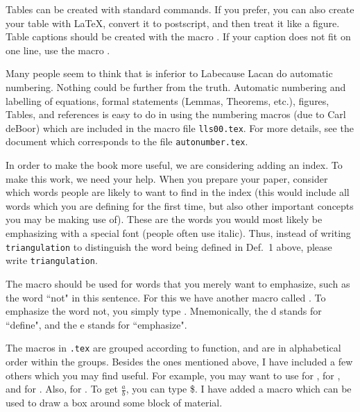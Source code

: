 Tables can be created with standard \Tex commands.  If you prefer,
you can also create your table with La\TeX, convert it to
postscript, and then treat it like a figure.
Table captions should be created with the macro  .
If your caption does not fit on one line, use
the macro .

Many people seem to think that \Tex is inferior to La\Tex because
La\Tex can do automatic numbering.  Nothing could be further
from the truth.  Automatic numbering and labelling of
equations, formal statements (Lemmas, Theorems, etc.), figures,
Tables, and references is easy to do in \Tex using
the numbering macros (due to Carl de\thinspace{}Boor) which
are included in the macro file {\tt lls00.tex}.
For more details, see the document  which corresponds to the \Tex file
{\tt autonumber.tex}.

In order to make the book more useful, we are considering adding an
index.  To make this work, we need your help.  When you prepare your
paper, consider which words people are likely to want to find in the
index (this would include all words which you are defining for the
first time, but also other important concepts you may be making use of).
These are the words you would most likely be emphasizing with a special
font (people often use italic).  Thus, instead of writing
{\tt \lb{} triangulation\rb}
to distinguish the word being defined in Def.~1 above, please write
{ \tt \lb{}triangulation\rb}. 

The macro  should  be used for words that you merely
want to emphasize, such as the word ``not" in this sentence.
For this we have another macro called .  To emphasize the
word not, you simply type .
Mnemonically, the d stands for ``define", and the e stands for
``emphasize".

The macros in {\tt \macname.tex} are grouped according to function,
and are in alphabetical order within the groups.
Besides the ones mentioned above, I have included a few others
which you may find useful.  For example, you may want to use
 for ,  for , and 
for .  Also,  for .
To get $\frac{a}{b}$,
you can type \$.
I have added a macro  which can be used to draw a box
around some block of material.

